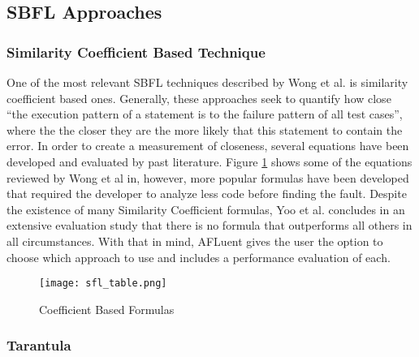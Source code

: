 \subsection{SBFL Approaches}
\label{subsec:sbfl}

\subsubsection{Similarity Coefficient Based Technique}
\label{subsubsec:coefficient_based}

One of the most relevant SBFL techniques described by Wong et al.
\cite{wong2016survey} is similarity coefficient based ones. Generally, these approaches
seek to quantify how close ``the execution pattern of a statement is to the
failure pattern of all test cases'', where the the closer they are the more
likely that this statement to contain the error. In order to create a
measurement of closeness, several equations have been developed and evaluated by
past literature. Figure \ref{fig:sbfl_eq} shows some of the equations reviewed by
Wong et al in, however, more popular formulas have been developed that
required the developer to analyze less code before finding the fault. Despite
the existence of many Similarity Coefficient formulas, Yoo et al.
\cite{yoo2014no} concludes in an extensive evaluation study that there is no
formula that outperforms all others in all circumstances. With that in mind,
AFLuent gives the user the option to choose which approach to use and includes
a performance evaluation of each.

\begin{figure}[!htb]
	\begin{center}
		\texttt{[image: sfl\_table.png]}
		\caption{\label{fig:sbfl_eq} Coefficient Based Formulas \cite{wong2016survey}}
	\end{center}
\end{figure}

\subsubsection{Tarantula}
\label{subsubsec:tarantula_lit}

